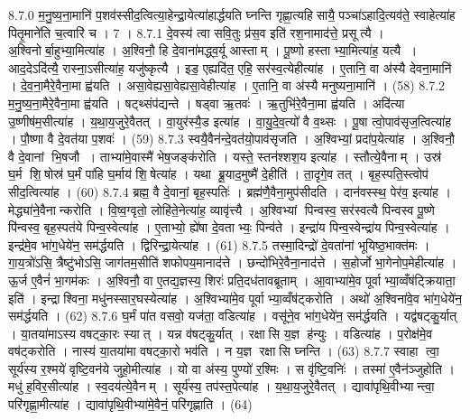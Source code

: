8.7.0
म॒नु॒ष्य॒ना॒मानि॑ प॒शव॑स्सीद॒त्वित्या॒हेन्द्रा॒येत्या॑हार्द्धयति घ्नन्ति गृह्णा॒त्यहिसायै॒ पञ्चा॑ऽहादि॒त्यव॑ते॒ स्वाहेत्या॑ह पितृ॒माने॑ति च॒त्वारि॑ च । 7 ।
8.7.1
दे॒वस्य॑ त्वा सवि॒तुः प्र॑स॒व इति॑ रश॒नामाद॑त्ते॒ प्रसूत्यै । अ॒श्विनोर्बा॒हुभ्या॒मित्या॑ह । अ॒श्विनौ॒ हि दे॒वाना॑मद्ध्व॒र्यू आस्ताम् । पू॒ष्णो हस्ताभ्या॒मित्या॑ह॒ यत्यै । आद॒देऽदि॑त्यै॒ रास्ना॒ऽसीत्या॑ह॒ यजु॑ष्कृत्यै । इड॒ एह्यदि॑त॒ एहि॒ सर॑स्व॒त्येहीत्या॑ह । ए॒तानि॒ वा अ॑स्यै देवना॒मानि॑ । दे॒व॒ना॒मैरे॒वैना॒मा ह्व॑यति । असा॒वेह्यसा॒वेह्यसा॒वेहीत्या॑ह । ए॒तानि॒ वा अ॑स्यै मनुष्यना॒मानि॑ । (58)
8.7.2
म॒नु॒ष्य॒ना॒मैरे॒वैना॒मा ह्व॑यति । षट्थ्संप॑द्यन्ते । षड्वा ऋ॒तवः॑ । ऋ॒तुभि॑रे॒वैना॒मा ह्व॑यति । अदि॑त्या उ॒ष्णीष॑म॒सीत्या॑ह । य॒था॒य॒जुरे॒वैतत् । वा॒युर॑स्यै॒ड इत्या॑ह । वा॒यु॒दे॒व॒त्यो॑ वै व॒थ्सः । पू॒षा त्वो॒पाव॑सृज॒त्वित्या॑ह । पौ॒ष्णा वै दे॒वत॑या प॒शवः॑ । (59)
8.7.3
स्वयै॒वैन॑न्दे॒वत॑यो॒पाव॑सृजति । अ॒श्विभ्यां॒ प्रदा॑प॒येत्या॑ह । अ॒श्विनौ॒ वै दे॒वानां भि॒षजौ । ताभ्या॑मे॒वास्मै॑ भेष॒जङ्क॑रोति । यस्ते॒ स्तन॑श्शश॒य इत्या॑ह । स्तौत्ये॒वैनाम् । उस्र॑ घ॒र्म शि॒षोस्र॑ घ॒र्मं पा॑हि घ॒र्माय॑ शि॒षेत्या॑ह । यथा ब्रू॒याद॒मुष्मै॑ दे॒हीति॑ । ता॒दृगे॒व तत् । बृह॒स्पति॒स्त्वोप॑ सीद॒त्वित्या॑ह । (60)
8.7.4
ब्रह्म॒ वै दे॒वानां॒ बृह॒स्पतिः॑ । ब्रह्म॑णै॒वैना॒मुप॑सीदति । दान॑वस्स्थ॒ पेर॑व॒ इत्या॑ह । मेद्ध्या॑ने॒वैनान्करोति । वि॒ष्व॒ग्वृतो॒ लोहि॑ते॒नेत्या॑ह॒ व्यावृ॑त्त्यै । अ॒श्विभ्यां पिन्वस्व॒ सर॑स्वत्यै पिन्वस्व पू॒ष्णे पि॑न्वस्व॒ बृह॒स्पत॑ये पिन्व॒स्वेत्या॑ह । ए॒ताभ्यो॒ ह्ये॑षा दे॒वताभ्यः॒ पिन्व॑ते । इन्द्रा॑य पिन्व॒स्वेन्द्रा॑य पिन्व॒स्वेत्या॑ह । इन्द्र॑मे॒व भा॑ग॒धेये॑न॒ सम॑र्द्धयति । द्विरिन्द्रा॒येत्या॑ह । (61)
8.7.5
तस्मा॒दिन्द्रो॑ दे॒वता॑नां भूयिष्ठ॒भाक्त॑मः । गा॒य॒त्रो॑ऽसि॒ त्रैष्टु॑भोऽसि॒ जाग॑तम॒सीति॑ शफोपय॒मानाद॑त्ते । छन्दो॑भिरे॒वैना॒नाद॑त्ते । स॒होर्जो भा॒गेनोप॒मेहीत्या॑ह । ऊ॒र्ज ए॒वैनं॑ भा॒गम॑कः । अ॒श्विनौ॒ वा ए॒तद्य॒ज्ञस्य॒ शिरः॑ प्रति॒दध॑तावब्रूताम् । आ॒वाभ्या॑मे॒व पूर्वाभ्या॒व्वँष॑ट्क्रियाता॒ इति॑ । इन्द्राश्विना॒ मधु॑नस्सार॒घस्येत्या॑ह । अ॒श्विभ्या॑मे॒व पूर्वाभ्या॒व्वँष॑ट्करोति । अथो॑ अ॒श्विना॑वे॒व भा॑ग॒धेये॑न॒ सम॑र्द्धयति । (62)
8.7.6
घ॒र्मं पा॑त वसवो॒ यज॑ता॒ वडित्या॑ह । वसू॑ने॒व भा॑ग॒धेये॑न॒ सम॑र्द्धयति । यद्व॑षट्कु॒र्यात् । या॒तया॑माऽस्य वषट्का॒रः स्यात् । यन्न व॑षट्कु॒र्यात् । रक्षासि य॒ज्ञ ह॑न्युः । वडित्या॑ह । प॒रोक्ष॑मे॒व वष॑ट्करोति । नास्य॑ या॒तया॑मा वषट्का॒रो भव॑ति । न य॒ज्ञ रक्षासि घ्नन्ति । (63)
8.7.7
स्वाहा त्वा॒ सूर्य॑स्य र॒श्मये॑ वृष्टि॒वन॑ये जुहो॒मीत्या॑ह । यो वा अ॑स्य॒ पुण्यो॑ र॒श्मिः । स वृ॑ष्टि॒वनिः॑ । तस्मा॑ ए॒वैन॑ञ्जुहोति । मधु॑ ह॒विर॒सीत्या॑ह । स्व॒दय॑त्ये॒वैनम् । सूर्य॑स्य॒ तप॑स्त॒पेत्या॑ह । य॒था॒य॒जुरे॒वैतत् । द्यावा॑पृथि॒वीभ्यान्त्वा॒ परि॑गृह्णा॒मीत्या॑ह । द्यावा॑पृथि॒वीभ्या॑मे॒वैनं॒ परि॑गृह्णाति । (64)
